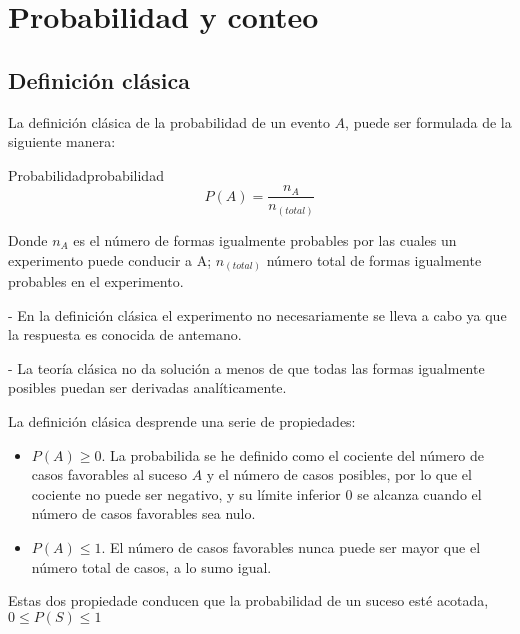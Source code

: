 \section{Probabilidad y conteo}

\subsection{Definici\'on cl\'asica}

La definici\'on cl\'asica de la probabilidad \cite{faber2012statistics} de un
evento $A$, puede ser formulada de la siguiente manera:

\begin{theorem}{Probabilidad}{probabilidad}
    \begin{equation}
        P(A)= \frac{n_A}{n_(total)}
    \end{equation}
\end{theorem}

Donde $n_A$ es el n\'umero de formas igualmente probables por las cuales un
experimento puede conducir a A; $n_(total)$ n\'umero total de formas igualmente
probables en el experimento.

- En la definici\'on cl\'asica el experimento no necesariamente se lleva a cabo
ya que la respuesta es conocida de antemano.

- La teor\'ia cl\'asica no da soluci\'on a menos de que todas las formas
igualmente posibles puedan ser derivadas anal\'iticamente.

La definición clásica desprende una serie de propiedades:

\begin{itemize}
\item $P(A) \geq 0$. La probabilida se he definido como el cociente del número
de casos favorables al suceso $A$ y el número de casos posibles, por lo que el
cociente no puede ser negativo, y su límite inferior 0 se alcanza cuando el
número de casos favorables sea nulo.

\item $P(A) \leq 1$. El número de casos favorables nunca puede ser mayor que el
número total de casos, a lo sumo igual.

\end{itemize}

Estas dos propiedade conducen  que la probabilidad de un suceso esté acotada, $0
\leq P(S) \leq 1$

